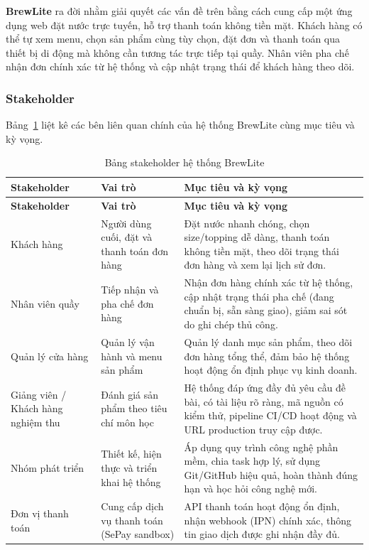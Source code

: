 \documentclass[a4paper]{article}
\begin{document}
\textbf{BrewLite} ra đời nhằm giải quyết các vấn đề trên bằng cách cung cấp một ứng dụng web đặt nước trực tuyến, hỗ trợ thanh toán không tiền mặt. Khách hàng có thể tự xem menu, chọn sản phẩm cùng tùy chọn, đặt đơn và thanh toán qua thiết bị di động mà không cần tương tác trực tiếp tại quầy. Nhân viên pha chế nhận đơn chính xác từ hệ thống và cập nhật trạng thái để khách hàng theo dõi.

\subsubsection{Stakeholder}

Bảng~\ref{tab:stakeholder} liệt kê các bên liên quan chính của hệ thống BrewLite cùng mục tiêu và kỳ vọng.

\begingroup
\renewcommand{\arraystretch}{1.25}
\setlength{\tabcolsep}{6pt}
\setlength{\arrayrulewidth}{0.5pt}
\begin{longtable}{|p{2.8cm}|p{3.5cm}|p{6.8cm}|}
\caption{Bảng stakeholder hệ thống BrewLite}
\label{tab:stakeholder} \\
\hline
\textbf{Stakeholder} & \textbf{Vai trò} & \textbf{Mục tiêu và kỳ vọng} \\ \hline
\endfirsthead
\hline
\textbf{Stakeholder} & \textbf{Vai trò} & \textbf{Mục tiêu và kỳ vọng} \\ \hline
\endhead
\endfoot
\endlastfoot

Khách hàng & Người dùng cuối, đặt và thanh toán đơn hàng & Đặt nước nhanh chóng, chọn size/topping dễ dàng, thanh toán không tiền mặt, theo dõi trạng thái đơn hàng và xem lại lịch sử đơn. \\ \hline

Nhân viên quầy & Tiếp nhận và pha chế đơn hàng & Nhận đơn hàng chính xác từ hệ thống, cập nhật trạng thái pha chế (đang chuẩn bị, sẵn sàng giao), giảm sai sót do ghi chép thủ công. \\ \hline

Quản lý cửa hàng & Quản lý vận hành và menu sản phẩm & Quản lý danh mục sản phẩm, theo dõi đơn hàng tổng thể, đảm bảo hệ thống hoạt động ổn định phục vụ kinh doanh. \\ \hline

Giảng viên / Khách hàng nghiệm thu & Đánh giá sản phẩm theo tiêu chí môn học & Hệ thống đáp ứng đầy đủ yêu cầu đề bài, có tài liệu rõ ràng, mã nguồn có kiểm thử, pipeline CI/CD hoạt động và URL production truy cập được. \\ \hline

Nhóm phát triển & Thiết kế, hiện thực và triển khai hệ thống & Áp dụng quy trình công nghệ phần mềm, chia task hợp lý, sử dụng Git/GitHub hiệu quả, hoàn thành đúng hạn và học hỏi công nghệ mới. \\ \hline

Đơn vị thanh toán & Cung cấp dịch vụ thanh toán (SePay sandbox) & API thanh toán hoạt động ổn định, nhận webhook (IPN) chính xác, thông tin giao dịch được ghi nhận đầy đủ. \\ \hline

\end{longtable}
\endgroup
\end{document}

